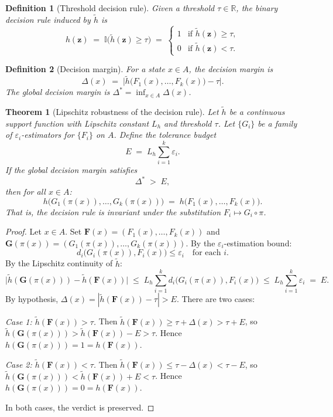 \documentclass[11pt]{article}
\newtheorem{definition}{Definition}
\newtheorem{theorem}{Theorem}
\begin{document}
\begin{definition}[Threshold decision rule]
Given a threshold $\tau\in\mathbb{R}$, the \emph{binary decision rule} induced by $\tilde{h}$ is
\[
h(\mathbf{z})\;=\;\mathbb{I}\!\bigl(\tilde{h}(\mathbf{z})\geq\tau\bigr)
\;=\;\begin{cases}1&\text{if }\tilde{h}(\mathbf{z})\geq\tau,\\0&\text{if }\tilde{h}(\mathbf{z})<\tau.\end{cases}
\]
\end{definition}

\begin{definition}[Decision margin]
For a state $x\in A$, the \emph{decision margin} is
\[
\Delta(x)\;=\;\bigl|\tilde{h}\bigl(F_1(x),\ldots,F_k(x)\bigr)-\tau\bigr|.
\]
The \emph{global decision margin} is $\Delta^{*}=\inf_{x\in A}\Delta(x)$.
\end{definition}

\begin{theorem}[Lipschitz robustness of the decision rule]\label{thm:lipschitz}
Let $\tilde{h}$ be a continuous support function with Lipschitz constant $L_h$ and threshold $\tau$. Let $\{G_i\}$ be a family of $\varepsilon_i$-estimators for $\{F_i\}$ on $A$. Define the \emph{tolerance budget}
\[
E\;=\;L_h\sum_{i=1}^k\varepsilon_i.
\]
If the global decision margin satisfies
\begin{equation}\label{eq:robustness}
\Delta^{*}\;>\;E,
\end{equation}
then for all $x\in A$:
\[
h\bigl(G_1(\pi(x)),\ldots,G_k(\pi(x))\bigr)\;=\;h\bigl(F_1(x),\ldots,F_k(x)\bigr).
\]
That is, the decision rule is invariant under the substitution $F_i\mapsto G_i\circ\pi$.
\end{theorem}

\begin{proof}
Let $x\in A$. Set $\mathbf{F}(x)=(F_1(x),\ldots,F_k(x))$ and $\mathbf{G}(\pi(x))=(G_1(\pi(x)),\ldots,G_k(\pi(x)))$. By the $\varepsilon_i$-estimation bound:
\[
d_i\bigl(G_i(\pi(x)),F_i(x)\bigr)\leq\varepsilon_i\quad\text{for each }i.
\]
By the Lipschitz continuity of $\tilde{h}$:
\[
\bigl|\tilde{h}(\mathbf{G}(\pi(x)))-\tilde{h}(\mathbf{F}(x))\bigr|
\;\leq\;L_h\sum_{i=1}^k d_i\bigl(G_i(\pi(x)),F_i(x)\bigr)
\;\leq\;L_h\sum_{i=1}^k\varepsilon_i
\;=\;E.
\]
By hypothesis, $\Delta(x)=|\tilde{h}(\mathbf{F}(x))-\tau|>E$. There are two cases:

\emph{Case 1: $\tilde{h}(\mathbf{F}(x))>\tau$.} Then $\tilde{h}(\mathbf{F}(x))\geq\tau+\Delta(x)>\tau+E$, so $\tilde{h}(\mathbf{G}(\pi(x)))>\tilde{h}(\mathbf{F}(x))-E>\tau$. Hence $h(\mathbf{G}(\pi(x)))=1=h(\mathbf{F}(x))$.

\emph{Case 2: $\tilde{h}(\mathbf{F}(x))<\tau$.} Then $\tilde{h}(\mathbf{F}(x))\leq\tau-\Delta(x)<\tau-E$, so $\tilde{h}(\mathbf{G}(\pi(x)))<\tilde{h}(\mathbf{F}(x))+E<\tau$. Hence $h(\mathbf{G}(\pi(x)))=0=h(\mathbf{F}(x))$.

In both cases, the verdict is preserved.
\end{proof}
\end{document}
